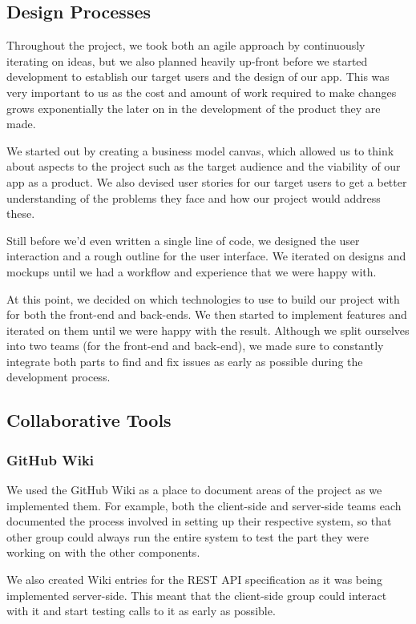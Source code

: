 \documentclass[11pt]{article}
\begin{document}
\subsection {Design Processes}

Throughout the project, we took both an agile approach by continuously iterating on ideas, but we also planned heavily up-front before we started development to establish our target users and the design of our app. This was very important to us as the cost and amount of work required to make changes grows exponentially the later on in the development of the product they are made.

We started out by creating a business model canvas, which allowed us to think about aspects to the project such as the target audience and the viability of our app as a product. We also devised user stories for our target users to get a better understanding of the problems they face and how our project would address these.

Still before we'd even written a single line of code, we designed the user interaction and a rough outline for the user interface. We iterated on designs and mockups until we had a workflow and experience that we were happy with.

At this point, we decided on which technologies to use to build our project with for both the front-end and back-ends. We then started to implement features and iterated on them until we were happy with the result. Although we split ourselves into two teams (for the front-end and back-end), we made sure to constantly integrate both parts to find and fix issues as early as possible during the development process.

\subsection {Collaborative Tools}
\subsubsection {GitHub Wiki}
We used the GitHub Wiki as a place to document areas of the project as we implemented them. For example, both the client-side and server-side teams each documented the process involved in setting up their respective system, so that other group could always run the entire system to test the part they were working on with the other components.

We also created Wiki entries for the REST API specification as it was being implemented server-side. This meant that the client-side group could interact with it and start testing calls to it as early as possible.
\end{document}
